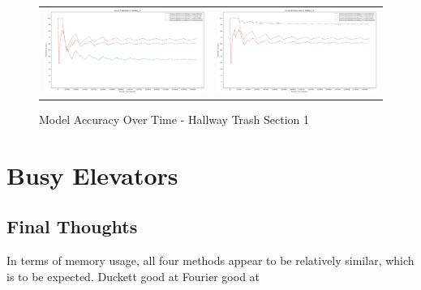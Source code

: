 \begin{figure}
  \begin{tabular}{cc}
    {\includegraphics[width = 3in]{images/results/Future_Predictions_on_hallway_T1.png}} &
    {\includegraphics[width = 3in]{images/results/Historical_Predictions_on_hallway_T1.png}} \\
  \end{tabular}
  \caption{Model Accuracy Over Time - Hallway Trash Section 1}
\end{figure}




\section{ Busy Elevators }


\subsection{ Final Thoughts }
In terms of memory usage, all four methods appear to be relatively similar, which is to be expected.
Duckett good at
Fourier good at


